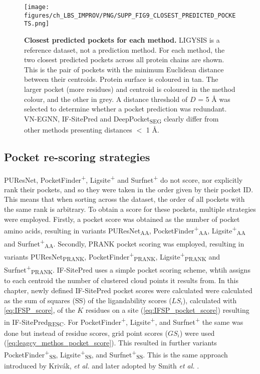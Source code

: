\begin{figure}[ht!]
    \centering
    \texttt{[image: figures/ch\_LBS\_IMPROV/PNG/SUPP\_FIG9\_CLOSEST\_PREDICTED\_POCKETS.png]}
    \caption[Closest predicted pockets for each methods]{\textbf{Closest predicted pockets for each method.} LIGYSIS is a reference dataset, not a prediction method. For each method, the two closest predicted pockets across all protein chains are shown. This is the pair of pockets with the minimum Euclidean distance between their centroids. Protein surface is coloured in tan. The larger pocket (more residues) and centroid is coloured in the method colour, and the other in grey. A distance threshold of $D$ = 5 \AA{} was selected to determine whether a pocket prediction was redundant. VN-EGNN, IF-SitePred and DeepPocket\textsubscript{SEG} clearly differ from other methods presenting distances $<$ 1 \AA{}.}
    \label{fig:closest_pred_pockets}
\end{figure}

\subsection{Pocket re-scoring strategies}

PUResNet, PocketFinder\textsuperscript{+}, Ligsite\textsuperscript{+} and Surfnet\textsuperscript{+} do not score, nor explicitly rank their pockets, and so they were taken in the order given by their pocket ID. This means that when sorting across the dataset, the order of all pockets with the same rank is arbitrary. To obtain a score for these pockets, multiple strategies were employed. Firstly, a pocket score was obtained as the number of pocket amino acids, resulting in variants PUResNet\textsubscript{AA}, PocketFinder\textsuperscript{+}\textsubscript{AA}, Ligsite\textsuperscript{+}\textsubscript{AA} and Surfnet\textsuperscript{+}\textsubscript{AA}. Secondly, PRANK pocket scoring was employed, resulting in variants PUResNet\textsubscript{PRANK}, PocketFinder\textsuperscript{+}\textsubscript{PRANK}, Ligsite\textsuperscript{+}\textsubscript{PRANK} and Surfnet\textsuperscript{+}\textsubscript{PRANK}. IF-SitePred uses a simple pocket scoring scheme, whtih assigns to each centroid the number of clustered cloud points it results from. In this chapter, newly defined IF-SitePred pocket scores were calculated were calculated as the sum of squares (SS) of the ligandability scores ($LS_{i}$), calculated with \autoref{eq:IFSP_score}, of the $K$ residues on a site (\autoref{eq:IFSP_pocket_score}) resulting in IF-SitePred\textsubscript{RESC}. For PocketFinder\textsuperscript{+}, Ligsite\textsuperscript{+}, and Surfnet\textsuperscript{+} the same was done but instead of residue scores, grid point scores ($GS_{i}$) were used (\autoref{eq:leagcy_methos_pocket_score}). This resulted in further variants PocketFinder\textsuperscript{+}\textsubscript{SS}, Ligsite\textsuperscript{+}\textsubscript{SS}, and Surfnet\textsuperscript{+}\textsubscript{SS}. This is the same approach introduced by Krivák, \textit{et al.} \cite{KRIVAK_2015_P2RANK} and later adopted by Smith \textit{et al.} \cite{SMITH_2024_GrASP}.

